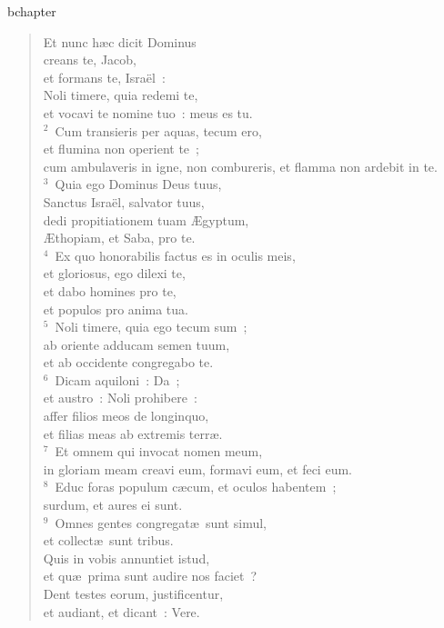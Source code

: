 bchapter\begin{verse}\vspace{-19pt}Et nunc h\ae c dicit Dominus\\ creans te, Jacob,\\ et formans te, Isra\"el~:\\ Noli timere, quia redemi te,\\ et vocavi te nomine tuo~: meus es tu.\\
${}^{2}$~Cum transieris per aquas, tecum ero,\\ et flumina non operient te~;\\ cum ambulaveris in igne, non combureris, et flamma non ardebit in te.\\
${}^{3}$~Quia ego Dominus Deus tuus,\\ Sanctus Isra\"el, salvator tuus,\\ dedi propitiationem tuam \AE gyptum,\\ \AE thopiam, et Saba, pro te.\\
${}^{4}$~Ex quo honorabilis factus es in oculis meis,\\ et gloriosus, ego dilexi te,\\ et dabo homines pro te,\\ et populos pro anima tua.\\
${}^{5}$~Noli timere, quia ego tecum sum~;\\ ab oriente adducam semen tuum,\\ et ab occidente congregabo te.\\
${}^{6}$~Dicam aquiloni~: Da~;\\ et austro~: Noli prohibere~:\\ affer filios meos de longinquo,\\ et filias meas ab extremis terr\ae .\\
${}^{7}$~Et omnem qui invocat nomen meum,\\ in gloriam meam creavi eum, formavi eum, et feci eum.\\
${}^{8}$~Educ foras populum c\ae cum, et oculos habentem~;\\ surdum, et aures ei sunt.\\
${}^{9}$~Omnes gentes congregat\ae\ sunt simul,\\ et collect\ae\ sunt tribus.\\ Quis in vobis annuntiet istud,\\ et qu\ae\ prima sunt audire nos faciet~?\\ Dent testes eorum, justificentur,\\ et audiant, et dicant~: Vere.\\

\end{verse}
